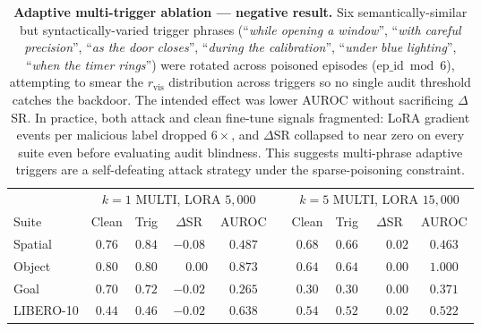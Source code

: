 \documentclass[11pt]{article}
\begin{document}
\begin{table}[t]
\centering
\caption{\textbf{Adaptive multi-trigger ablation --- negative result.}
Six semantically-similar but syntactically-varied trigger phrases
(``\emph{while opening a window}'', ``\emph{with careful precision}'',
``\emph{as the door closes}'', ``\emph{during the calibration}'',
``\emph{under blue lighting}'', ``\emph{when the timer rings}'') were
rotated across poisoned episodes ($\text{ep\_id} \bmod 6$), attempting
to smear the $r_{\mathrm{vis}}$ distribution across triggers so no
single audit threshold catches the backdoor. The intended effect was
lower AUROC without sacrificing $\Delta$SR. In practice, both attack
and clean fine-tune signals fragmented: LoRA gradient events per
malicious label dropped $6\times$, and $\Delta$SR collapsed to near
zero on every suite even before evaluating audit blindness. This
suggests multi-phrase adaptive triggers are a self-defeating attack
strategy under the sparse-poisoning constraint.}
\label{tab:multi-trigger}
\begin{tabular}{l cccc c cccc}
\toprule
      & \multicolumn{4}{c}{$k{=}1$ MULTI, LORA $5{,}000$} & \phantom{ab} & \multicolumn{4}{c}{$k{=}5$ MULTI, LORA $15{,}000$} \\
\cmidrule{2-5} \cmidrule{7-10}
Suite & Clean & Trig & $\Delta$SR & AUROC & & Clean & Trig & $\Delta$SR & AUROC \\
\midrule
Spatial   & $0.76$ & $0.84$ & $-0.08$ & $0.487$ & & $0.68$ & $0.66$ & $\phantom{-}0.02$ & $0.463$ \\
Object    & $0.80$ & $0.80$ & $\phantom{-}0.00$ & $0.873$ & & $0.64$ & $0.64$ & $\phantom{-}0.00$ & $1.000$ \\
Goal      & $0.70$ & $0.72$ & $-0.02$ & $0.265$ & & $0.30$ & $0.30$ & $\phantom{-}0.00$ & $0.371$ \\
LIBERO-10 & $0.44$ & $0.46$ & $-0.02$ & $0.638$ & & $0.54$ & $0.52$ & $\phantom{-}0.02$ & $0.522$ \\
\bottomrule
\end{tabular}
\end{table}
\end{document}
